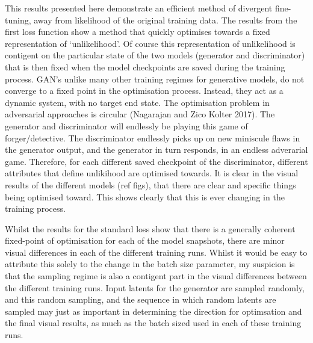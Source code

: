 This results presented here demonstrate an efficient method of divergent fine-tuning, away from likelihood of the original training data. 
The results from the first loss function show a method that quickly optimises towards a fixed representation of `unlikelihood'.
Of course this representation of unlikelihood is contigent on the particular state of the two models (generator and discriminator) that is then fixed when the model checkpoints are saved during the training process.
GAN's unlike many other training regimes for generative models,  do not converge to a fixed point in the optimisation process.
Instead, they act as a dynamic system, with no target end state. 
The optimisation problem in adversarial approaches is circular (Nagarajan and Zico Kolter 2017). 
The generator and discriminator will endlessly be playing this game of forger/detective. 
The discriminator endlessly picks up on new miniscule flaws in the generator output, and the generator in turn responds, in an endless adverarial game.
Therefore, for each different saved checkpoint of the discriminator, different attributes that define unlikihood are optimised towards.
It is clear in the visual results of the different models (ref figs), that there are clear and specific things being optimised toward.
This shows clearly that this is ever changing in the training process.

Whilst the results for the standard loss show that there is a generally coherent fixed-point of optimisation for each of the model snapshots, there are minor visual differences in each of the different training runs.
Whilst it would be easy to attribute this solely to the change in the batch size parameter, my suspicion is that the sampling regime is also a contigent part in the visual differences between the different training runs.
Input latents for the generator are sampled randomly, and this random sampling, and the sequence in which random latents are sampled may just as important in determining the direction for optimsation and the final visual results, as much as the batch sized used in each of these training runs. 

